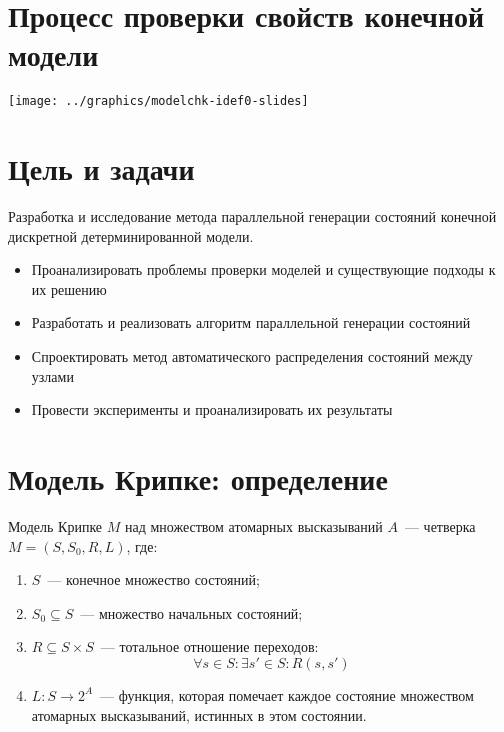 \documentclass[12pt]{article}
\begin{document}
\TitleSlide

\section{Процесс проверки свойств конечной модели}
\label{sec:modelchk-idef0}

\begin{center}
  \texttt{[image: ../graphics/modelchk-idef0-slides]}
\end{center}

\section{Цель и задачи}
\label{sec:goal-tasks}

Разработка и исследование метода параллельной генерации состояний конечной дискретной
детерминированной модели.

\small {
  \begin{itemize}
  \item Проанализировать проблемы проверки моделей и существующие подходы к их решению
  \item Разработать и реализовать алгоритм параллельной генерации состояний
  \item Спроектировать метод автоматического распределения состояний между узлами
  \item Провести эксперименты и проанализировать их результаты
  \end{itemize}
}

\section{Модель Крипке: определение}
\label{sec:kripke-def}

Модель Крипке $M$ над множеством атомарных высказываний $A$~--- четверка $M=(S, S_0, R,
L)$, где:
\begin{enumerate}
\item $S$~--- конечное множество состояний;
\item $S_0 \subseteq S$~--- множество начальных состояний;
\item $R \subseteq S \times S$~--- тотальное отношение переходов: $$\forall s \in S\colon \exists
  s' \in S \colon R(s, s')$$
\item $L: S \rightarrow 2^{A}$~--- функция, которая помечает каждое состояние множеством
  атомарных высказываний, истинных в этом состоянии.
\end{enumerate}
\end{document}
